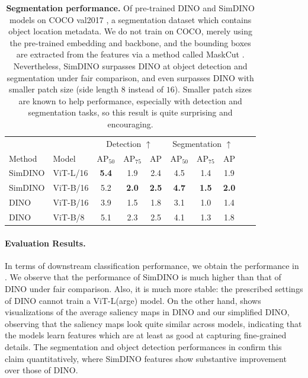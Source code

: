 \documentclass[../../book-main.tex]{subfiles}
\begin{document}
\begin{table}[t]
\caption{\small\textbf{Segmentation performance.} Of pre-trained DINO
    and SimDINO models on COCO val2017 \citep{lin2014microsoft}, a
    segmentation dataset which contains object location metadata.
    We do
    not train on COCO, merely using the pre-trained embedding and
    backbone, and the bounding boxes are extracted from the features via
    a method called MaskCut \citep{wang2023cut}.
    Nevertheless, SimDINO
    surpasses DINO at object detection and segmentation under fair
    comparison, and even surpasses DINO with smaller patch size (side
    length \(8\) instead of \(16\)).
    Smaller patch sizes are known to
    help performance, especially with detection and segmentation tasks,
so this result is quite surprising and encouraging.}
\centering
\begin{tabular}{@{}llcccccccc@{}}
    \toprule
    &  & \multicolumn{3}{c}{Detection \(\uparrow\)} &
    \multicolumn{3}{c}{Segmentation \(\uparrow\)} \\
    Method & Model & AP\(_{50}\)  & AP\(_{75}\) & AP & AP\(_{50}\) &
    AP\(_{75}\) & AP  \\
    \midrule
    SimDINO &ViT-L/16 &\textbf{5.4} &1.9 &2.4 &4.5 &1.4 &1.9 \\
    SimDINO &ViT-B/16 &5.2 & \textbf{2.0} & \textbf{2.5} & \textbf{4.7} & \textbf{1.5} & \textbf{2.0} \\
    DINO &ViT-B/16 &3.9 &1.5 &1.8 &3.1 &1.0 &1.4 \\
    \midrule
    \color{gray} DINO & \color{gray} ViT-B/8 & \color{gray}5.1 &
    \color{gray}2.3 & \color{gray}2.5 & \color{gray}4.1 &
    \color{gray}1.3 & \color{gray}1.8 \\
    \bottomrule
\end{tabular}
\label{tab:dino_segmentation}
\end{table}

\paragraph{Evaluation Results.} In terms of downstream classification
performance, we obtain the performance in
.
We observe that the
performance of SimDINO is much higher than that of DINO under fair
comparison.
Also, it is much more stable: the prescribed settings of
DINO cannot train a ViT-L(arge) model.
On the other hand,
 shows visualizations of the
average saliency maps in DINO and our simplified DINO, observing that
the saliency maps look quite similar across models, indicating that
the models learn features which are at least as good at capturing
fine-grained details.
The segmentation and object detection
performances in  confirm this claim
quantitatively, where SimDINO features show substantive improvement
over those of DINO.
\end{document}
